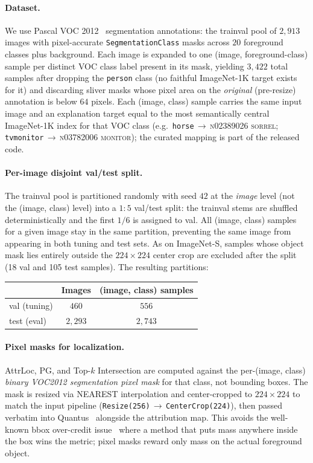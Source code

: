 \documentclass[twoside]{article}
\newcommand{\1}{\mathbf{1}}
\begin{document}
\paragraph{Dataset.}
We use Pascal VOC 2012~\citep{Everingham2010voc} segmentation annotations: the trainval pool of
$2{,}913$ images with pixel-accurate \texttt{Seg\-mentationClass} masks across $20$ foreground
classes plus background. Each image is expanded to one (image, foreground-class) sample per
distinct VOC class label present in its mask, yielding $3{,}422$ total samples after dropping the
\texttt{person} class (no faithful ImageNet-1K target exists for it) and discarding sliver masks
whose pixel area on the \emph{original} (pre-resize) annotation is below $64$ pixels. Each (image,
class) sample carries the same input image and an explanation target equal to the most semantically
central ImageNet-1K index for that VOC class (e.g.\ \texttt{horse}$\,\to\,$\textsc{n02389026
sorrel}; \texttt{tvmonitor}$\,\to\,$\textsc{n03782006 monitor}); the curated mapping is part of the
released code.

\paragraph{Per-image disjoint val/test split.} The trainval pool is partitioned randomly with seed $42$ at the \emph{image} level (not the (image,
class) level) into a $1{:}5$ val/test split: the trainval stems are shuffled deterministically and
the first $1/6$ is assigned to val. All (image, class) samples for a given image stay in the same
partition, preventing the same image from appearing in both tuning and test sets. As on
ImageNet-S, samples whose object mask lies entirely outside the $224{\times}224$ center crop are
excluded after the split (18 val and 105 test samples). The resulting partitions:
\begin{center}
    \begin{tabular}{lcc}
        \toprule
        & Images & (image, class) samples \\
        \midrule
        val (tuning)  & $460$  & $556$ \\
        test (eval)   & $2{,}293$ & $2{,}743$ \\
        \bottomrule
    \end{tabular}
\end{center}

\paragraph{Pixel masks for localization.} \ac{AttrLoc}, \ac{PG}, and Top-$k$ Intersection are computed against the per-(image, class)
\emph{binary VOC2012 segmentation pixel mask} for that class, not bounding boxes. The mask is
resized via NEAREST interpolation and center-cropped to $224{\times}224$ to match the input
pipeline (\texttt{Resize(256)$\,\to\,$CenterCrop(224)}), then passed verbatim into
Quantus~\citep{hedstrom2023quantus} alongside the attribution map. This avoids the well-known bbox
over-credit issue~\citep{Selvaraju2017gradcam} where a method that puts mass anywhere inside the
box wins the metric; pixel masks reward only mass on the actual foreground object.
\end{document}
